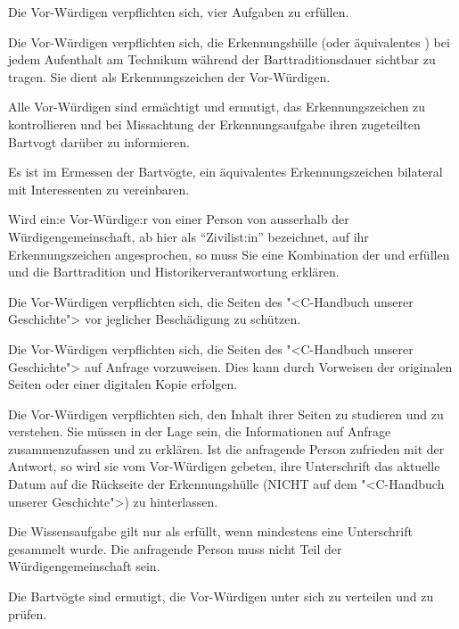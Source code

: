 \documentclass[fontsize=12pt,parskip=half]{scrartcl}
\begin{document}
\begin{contract}
  \Clause[title={Erkennungs-, Schutz-, Vorweis-, Wissensaufgabe}] \label{H.aufgaben}
  Die Vor-Würdigen verpflichten sich, vier Aufgaben zu erfüllen.

  \SubClause[title={Erkennungsaufgabe}]\label{H.erkennungsaufgabe}
  Die Vor-Würdigen verpflichten sich, die Erkennungshülle (oder äquivalentes ) bei jedem Aufenthalt am Technikum während der
  Barttraditionsdauer sichtbar zu tragen. Sie dient als Erkennungszeichen der Vor-Würdigen.

  Alle Vor-Würdigen sind ermächtigt und ermutigt, das Erkennungszeichen zu kontrollieren und bei Missachtung der Erkennungsaufgabe ihren zugeteilten Bartvogt darüber zu informieren.

  Es ist im Ermessen der Bartvögte, ein äquivalentes Erkennungszeichen bilateral mit Interessenten zu vereinbaren.\label{aequivalentes}

  Wird ein:e Vor-Würdige:r von einer Person von ausserhalb der Würdigengemeinschaft, ab hier als ``Zivilist:in'' bezeichnet, auf ihr Erkennungszeichen angesprochen, so muss Sie eine Kombination
  der  und  erfüllen und die Barttradition und Historikerverantwortung  erklären.

  \SubClause[title={Schutzaufgabe}]\label{H.schutzaufgabe}
  Die Vor-Würdigen verpflichten sich, die Seiten des "<C-Handbuch unserer Geschichte"> vor jeglicher Beschädigung zu schützen.

  \SubClause[title={Vorweisaufgabe}]\label{H.vorweisaufgabe}
  Die Vor-Würdigen verpflichten sich, die Seiten des "<C-Handbuch unserer Geschichte"> auf Anfrage vorzuweisen. Dies kann durch Vorweisen der originalen
  Seiten oder einer digitalen Kopie erfolgen.

  \SubClause[title={Wissensaufgabe}]\label{H.wissensaufgabe}
  Die Vor-Würdigen verpflichten sich, den Inhalt ihrer Seiten zu studieren und zu verstehen. Sie müssen in der Lage sein, die Informationen
  auf Anfrage zusammenzufassen und zu erklären. Ist die anfragende Person zufrieden mit der Antwort, so wird sie vom Vor-Würdigen gebeten,
  ihre Unterschrift das aktuelle Datum auf die Rückseite der Erkennungshülle (NICHT auf dem "<C-Handbuch unserer Geschichte">) zu hinterlassen.

  Die Wissensaufgabe gilt nur als erfüllt, wenn mindestens eine Unterschrift gesammelt wurde. Die anfragende Person muss nicht Teil der Würdigengemeinschaft sein.

  Die Bartvögte sind ermutigt, die Vor-Würdigen unter sich zu verteilen und zu prüfen.


\end{contract}
\end{document}
